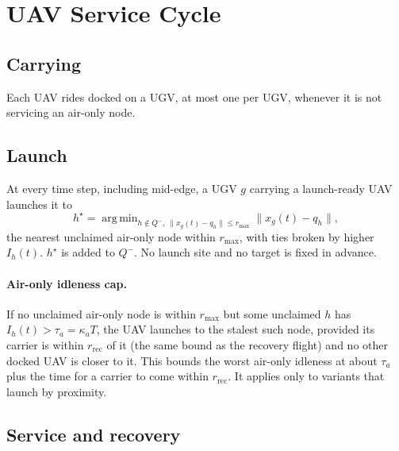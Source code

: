 \documentclass[11pt]{article}
\DeclareMathOperator*{\argmin}{arg\,min}
\theoremstyle{definition}
\theoremstyle{plain}
\begin{document}
\section{UAV Service Cycle}

\subsection{Carrying}
Each UAV rides docked on a UGV, at most one per UGV, whenever it is not
servicing an air-only node.

\subsection{Launch}
\label{sec:launch}

At every time step, including mid-edge, a UGV $g$ carrying a launch-ready
UAV launches it to
\begin{equation}
h^\star = \argmin_{h \notin Q^-,\ \|x_g(t) - q_h\| \leq r_{\max}}
\|x_g(t) - q_h\| ,
\end{equation}
the nearest unclaimed air-only node within $r_{\max}$, with ties broken by
higher $I_h(t)$. $h^\star$ is added to $Q^-$. No launch site and no target
is fixed in advance.

\paragraph{Air-only idleness cap.} If no unclaimed air-only node is within
$r_{\max}$ but some unclaimed $h$ has $I_h(t) > \tau_a = \kappa_a T$, the
UAV launches to the stalest such node, provided its carrier is within
$r_{\mathrm{rec}}$ of it (the same bound as the recovery flight) and no
other docked UAV is closer to it. This bounds the worst air-only idleness at
about $\tau_a$ plus the time for a carrier to come within $r_{\mathrm{rec}}$.
It applies only to variants that launch by proximity.

\subsection{Service and recovery}
\label{sec:cycle}
\end{document}
